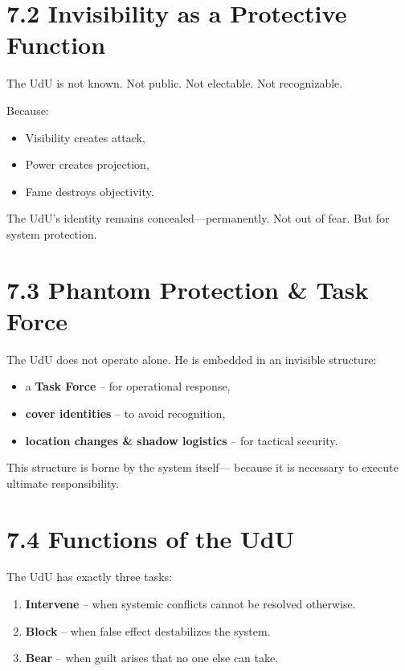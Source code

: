 \documentclass[12pt,a4paper]{book}
\begin{document}
\section*{7.2 Invisibility as a Protective Function}

The UdU is not known.  
Not public. Not electable. Not recognizable.

Because:  
\begin{itemize}
    \item Visibility creates attack,
    \item Power creates projection,
    \item Fame destroys objectivity.
\end{itemize}

The UdU’s identity remains concealed—permanently.  
Not out of fear. But for system protection.

\section*{7.3 Phantom Protection \& Task Force}

The UdU does not operate alone.  
He is embedded in an invisible structure:

\begin{itemize}
    \item a \textbf{Task Force} – for operational response,
    \item \textbf{cover identities} – to avoid recognition,
    \item \textbf{location changes \& shadow logistics} – for tactical security.
\end{itemize}

This structure is borne by the system itself—  
because it is necessary to execute ultimate responsibility.

\section*{7.4 Functions of the UdU}

The UdU has exactly three tasks:

\begin{enumerate}
    \item \textbf{Intervene} – when systemic conflicts cannot be resolved otherwise.
    \item \textbf{Block} – when false effect destabilizes the system.
    \item \textbf{Bear} – when guilt arises that no one else can take.
\end{enumerate}
\end{document}
